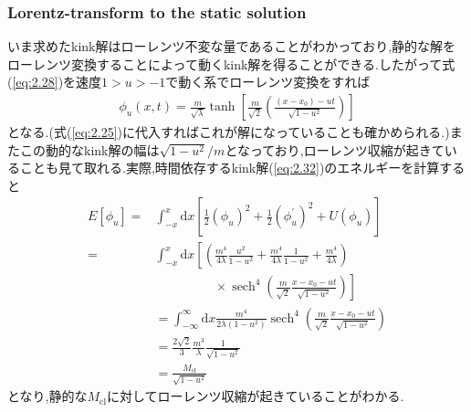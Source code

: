 \documentclass[dvipdfmx,11pt,a4paper,oneside,openany]{jsbook}
\begin{document}
\subsubsection{Lorentz-transform to the static solution}
いま求めたkink解はローレンツ不変な量であることがわかっており,静的な解をローレンツ変換することによって動くkink解を得ることができる.したがって式(\ref{eq:2.28})を速度$1>u>-1$で動く系でローレンツ変換をすれば
\begin{align}
    \phi_{u}(x, t)=\frac{m}{\sqrt{\lambda}} \tanh \left[\frac{m}{\sqrt{2}}\left(\frac{\left(x-x_{0}\right)-u t}{\sqrt{1-u^{2}}}\right)\right]\label{eq:2.32}
\end{align}
となる.(式(\ref{eq:2.25})に代入すればこれが解になっていることも確かめられる.)またこの動的なkink解の幅は$\sqrt{1-u^2}/m$となっており,ローレンツ収縮が起きていることも見て取れる.実際,時間依存するkink解(\ref{eq:2.32})のエネルギーを計算すると
\begin{align}
    E\left[\phi_{u}\right]= & \int_{-x}^{x} \mathrm{d} x\left[\frac{1}{2}\left(\phi_{u}\right)^{2}+\frac{1}{2}\left(\phi_{u}^{'}\right)^{2}+U\left(\phi_{u}\right)\right]\nonumber                                 \\
    =                       & \int_{-x}^{x} \mathrm{d} x\left[\left(\frac{m^{4}}{4 \lambda} \frac{u^{2}}{1-u^{2}}+\frac{m^{4}}{4 \lambda} \frac{1}{1-u^{2}}+\frac{m^{4}}{4 \lambda}\right)\right.\nonumber         \\
                            & \qquad\ \ \ \ \ \ \ \ \ \ \ \  \times\left.\operatorname{sech}^{4}\left(\frac{m}{\sqrt{2}} \frac{x-x_{0}-u t}{\sqrt{1-u^{2}}}\right)\right]\nonumber                                 \\
                            & =\int_{-\infty}^{\infty} \mathrm{d} x \frac{m^{4}}{2 \lambda\left(1-u^{2}\right)} \operatorname{sech}^{4}\left(\frac{m}{\sqrt{2}} \frac{x-x_{0}-u t}{\sqrt{1-u^{2}}}\right)\nonumber \\
                            & =\frac{2 \sqrt{2}}{3} \frac{m^{3}}{\lambda} \frac{1}{\sqrt{1-u^{2}}}\nonumber                                                                                                        \\
                            & =\frac{M_{\mathrm{cl}}}{\sqrt{1-u^{2}}}
\end{align}
となり,静的な$M_{\mathrm{cl}}$に対してローレンツ収縮が起きていることがわかる.
\end{document}
